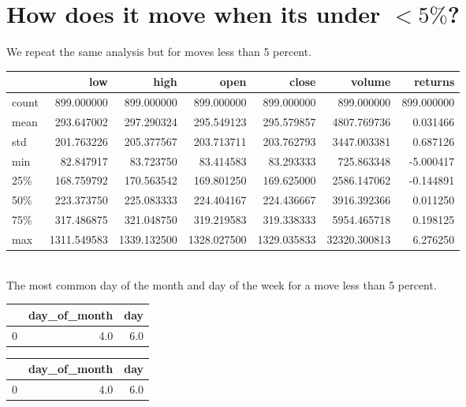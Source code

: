 \section{ How does it move when its under $<5 \% $?}
We repeat the same analysis but for moves less than 5 percent.
\vspace{0.5cm}\\
\begin{tabular}{lrrrrrr}
\toprule
{} &          low &         high &         open &        close &        volume &     returns \\
\midrule
count &   899.000000 &   899.000000 &   899.000000 &   899.000000 &    899.000000 &  899.000000 \\
mean  &   293.647002 &   297.290324 &   295.549123 &   295.579857 &   4807.769736 &    0.031466 \\
std   &   201.763226 &   205.377567 &   203.713711 &   203.762793 &   3447.003381 &    0.687126 \\
min   &    82.847917 &    83.723750 &    83.414583 &    83.293333 &    725.863348 &   -5.000417 \\
25\%   &   168.759792 &   170.563542 &   169.801250 &   169.625000 &   2586.147062 &   -0.144891 \\
50\%   &   223.373750 &   225.083333 &   224.404167 &   224.436667 &   3916.392366 &    0.011250 \\
75\%   &   317.486875 &   321.048750 &   319.219583 &   319.338333 &   5954.465718 &    0.198125 \\
max   &  1311.549583 &  1339.132500 &  1328.027500 &  1329.035833 &  32320.300813 &    6.276250 \\
\bottomrule
\end{tabular}
\vspace{0.5cm}\\
The most common day of the month and day of the week for a move less than 5 percent.
\vspace{0.5cm}\\
\begin{tabular}{lrr}
\toprule
{} &  day\_of\_month &  day \\
\midrule
0 &           4.0 &  6.0 \\
\bottomrule
\end{tabular}\begin{tabular}{lrr}
\toprule
{} &  day\_of\_month &  day \\
\midrule
0 &           4.0 &  6.0 \\
\bottomrule
\end{tabular}
